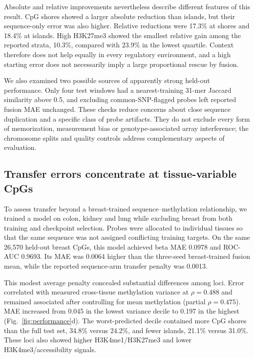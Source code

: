 \documentclass[11pt,letterpaper,twocolumn]{article}
\begin{document}
Absolute and relative improvements nevertheless describe different features of this result. CpG shores showed a larger absolute reduction than islands, but their sequence-only error was also higher. Relative reductions were 17.3\% at shores and 18.4\% at islands. High H3K27me3 showed the smallest relative gain among the reported strata, 10.3\%, compared with 23.9\% in the lowest quartile. Context therefore does not help equally in every regulatory environment, and a high starting error does not necessarily imply a large proportional rescue by fusion.

We also examined two possible sources of apparently strong held-out performance. Only four test windows had a nearest-training 31-mer Jaccard similarity above 0.5, and excluding common-SNP-flagged probes left reported fusion MAE unchanged. These checks reduce concerns about close sequence duplication and a specific class of probe artifacts. They do not exclude every form of memorization, measurement bias or genotype-associated array interference; the chromosome splits and quality controls address complementary aspects of evaluation.

\subsection{Transfer errors concentrate at tissue-variable CpGs}
To assess transfer beyond a breast-trained sequence--methylation relationship, we trained a model on colon, kidney and lung while excluding breast from both training and checkpoint selection. Probes were allocated to individual tissues so that the same sequence was not assigned conflicting training targets. On the same 26,570 held-out breast CpGs, this model achieved beta MAE 0.0978 and ROC-AUC 0.9693. Its MAE was 0.0064 higher than the three-seed breast-trained fusion mean, while the reported sequence-arm transfer penalty was 0.0013.

This modest average penalty concealed substantial differences among loci. Error correlated with measured cross-tissue methylation variance at $\rho=0.488$ and remained associated after controlling for mean methylation (partial $\rho=0.475$). MAE increased from 0.045 in the lowest variance decile to 0.197 in the highest (Fig.~\ref{fig:performance}d). The worst-predicted decile contained more CpG shores than the full test set, 34.8\% versus 24.2\%, and fewer islands, 21.1\% versus 31.0\%. These loci also showed higher H3K4me1/H3K27me3 and lower H3K4me3/accessibility signals.
\end{document}
